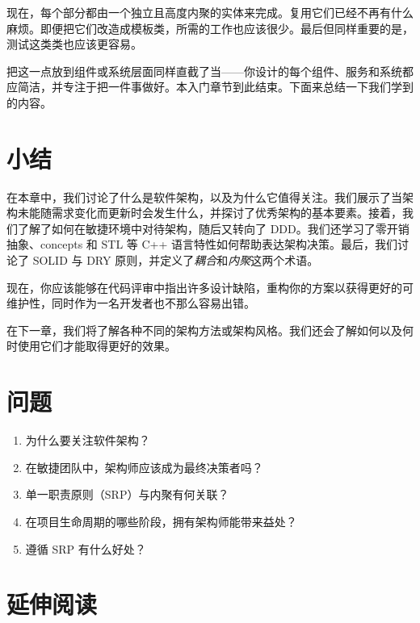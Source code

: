 现在，每个部分都由一个独立且高度内聚的实体来完成。复用它们已经不再有什么麻烦。即便把它们改造成模板类，所需的工作也应该很少。最后但同样重要的是，测试这类类也应该更容易。

\label{idx:072}
把这一点放到组件或系统层面同样直截了当——你设计的每个组件、服务和系统都应简洁，并专注于把一件事做好。本入门章节到此结束。下面来总结一下我们学到的内容。

\section{小结}

在本章中，我们讨论了什么是软件架构，以及为什么它值得关注。我们展示了当架构未能随需求变化而更新时会发生什么，并探讨了优秀架构的基本要素。接着，我们了解了如何在敏捷环境中对待架构，随后又转向了 DDD。我们还学习了零开销抽象、concepts 和 STL 等 C++ 语言特性如何帮助表达架构决策。最后，我们讨论了 SOLID 与 DRY 原则，并定义了\emph{耦合}和\emph{内聚}这两个术语。

现在，你应该能够在代码评审中指出许多设计缺陷，重构你的方案以获得更好的可维护性，同时作为一名开发者也不那么容易出错。

在下一章，我们将了解各种不同的架构方法或架构风格。我们还会了解如何以及何时使用它们才能取得更好的效果。

\section{问题}

\begin{enumerate}
\item 为什么要关注软件架构？
\item 在敏捷团队中，架构师应该成为最终决策者吗？
\item 单一职责原则（SRP）与内聚有何关联？
\item 在项目生命周期的哪些阶段，拥有架构师能带来益处？
\item 遵循 SRP 有什么好处？
\end{enumerate}

\section{延伸阅读}

